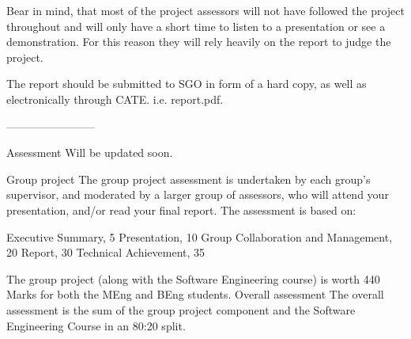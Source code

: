 \documentclass[a4paper, 11pt]{article}
\begin{document}
  Bear in mind, that most of the project assessors will not have followed the
  project throughout and will only have a short time to listen to a
  presentation or see a demonstration. For this reason they will rely heavily
  on the report to judge the project.

  The report should be submitted to SGO in form of a hard copy, as well as
  electronically through CATE. i.e. report.pdf. 

  ------------------------

  Assessment
  Will be updated soon.

  Group project
  The group project assessment is undertaken by each group's supervisor, and
  moderated by a larger group of assessors, who will attend your presentation,
  and/or read your final report. The assessment is based on:

      Executive Summary, 5
      Presentation, 10
      Group Collaboration and Management, 20
      Report, 30
      Technical Achievement, 35

  The group project (along with the Software Engineering course) is worth 440
  Marks for both the MEng and BEng students.
  Overall assessment
  The overall assessment is the sum of the group project component and the
  Software Engineering Course in an 80:20 split.
\end{document}
